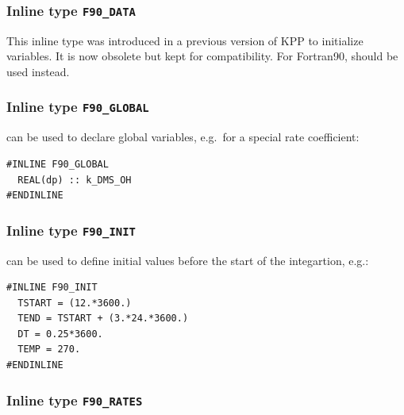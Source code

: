 \documentclass[twoside]{article}
\begin{document}
\subsubsection{Inline type {\tt F90\_DATA}}
\label{sec:f90-data}

This inline type was introduced in a previous version of KPP to
initialize variables. It is now obsolete but kept for compatibility. For
Fortran90,  should be used instead.

\subsubsection{Inline type {\tt F90\_GLOBAL}}
\label{sec:f90-global}

 can be used to declare global variables, e.g.\ for a
special rate coefficient:
%
\begin{verbatim}
#INLINE F90_GLOBAL
  REAL(dp) :: k_DMS_OH
#ENDINLINE
\end{verbatim}

\subsubsection{Inline type {\tt F90\_INIT}}
\label{sec:f90-init}

 can be used to define initial values before the start of
the integartion, e.g.:
%
\begin{verbatim}
#INLINE F90_INIT
  TSTART = (12.*3600.)
  TEND = TSTART + (3.*24.*3600.)
  DT = 0.25*3600.
  TEMP = 270.
#ENDINLINE
\end{verbatim}

\subsubsection{Inline type {\tt F90\_RATES}}
\label{sec:f90-rates}
\end{document}
